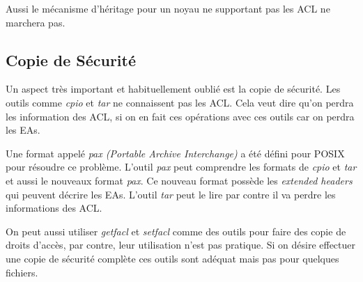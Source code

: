 Aussi le mécanisme d'héritage pour un noyau ne supportant pas les ACL ne marchera pas. 

\subsection*{Copie de Sécurité}

Un aspect très important et habituellement oublié est la copie de sécurité. Les outils comme \emph{cpio} et \emph{tar} ne connaissent pas les ACL. Cela veut dire qu'on perdra les information des ACL, si on en fait ces opérations avec ces outils car on perdra les EAs.

Une format appelé \emph{pax (Portable Archive Interchange)} a été défini pour POSIX pour résoudre ce problème. L'outil \emph{pax} peut comprendre les formats de \emph{cpio} et \emph{tar} et aussi le nouveaux format \emph{pax}. Ce nouveau format possède les \emph{extended headers} qui peuvent décrire les EAs. L'outil \emph{tar} peut le lire par contre il va perdre les informations des ACL. 

On peut aussi utiliser \emph{getfacl} et \emph{setfacl} comme des outils pour faire des copie de droits d'accès, par contre, leur utilisation n'est pas pratique. Si on désire effectuer une copie de sécurité complète ces outils sont adéquat mais pas pour quelques fichiers. 

